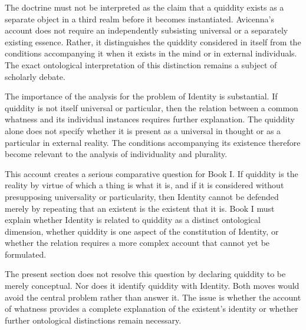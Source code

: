 \label{para:VS.B01.P01.C08.S13.SS06.P002}

The doctrine must not be interpreted
as the claim that a quiddity exists
as a separate object in a third
realm before it becomes instantiated.
Avicenna's account does not require
an independently subsisting universal
or a separately existing essence.
Rather, it distinguishes the
quiddity considered in itself
from the conditions accompanying
it when it exists in the mind
or in external individuals.
The exact ontological interpretation
of this distinction remains
a subject of scholarly debate.
\citep[Ilahiyyat, V.1--2]{AvicennaMetaphysics}

\label{para:VS.B01.P01.C08.S13.SS06.P003}

The importance of the analysis
for the problem of Identity is
substantial. If quiddity is not
itself universal or particular,
then the relation between a
common whatness and its individual
instances requires further
explanation. The quiddity alone
does not specify whether it is
present as a universal in thought
or as a particular in external
reality. The conditions accompanying
its existence therefore become
relevant to the analysis of
individuality and plurality.
\citep[Ilahiyyat, V.1--2]{AvicennaMetaphysics}

\label{para:VS.B01.P01.C08.S13.SS06.P004}

This account creates a serious
comparative question for Book I.
If quiddity is the reality by
virtue of which a thing is what
it is, and if it is considered
without presupposing universality
or particularity, then Identity
cannot be defended merely by
repeating that an existent is
the existent that it is. Book I
must explain whether Identity
is related to quiddity as a
distinct ontological dimension,
whether quiddity is one aspect
of the constitution of Identity,
or whether the relation requires
a more complex account that
cannot yet be formulated.
\citep[Ilahiyyat, I.5 and V.1]{AvicennaMetaphysics}

\label{para:VS.B01.P01.C08.S13.SS06.P005}

The present section does not
resolve this question by declaring
quiddity to be merely conceptual.
Nor does it identify quiddity
with Identity. Both moves would
avoid the central problem rather
than answer it. The issue is
whether the account of whatness
provides a complete explanation
of the existent's identity or
whether further ontological
distinctions remain necessary.



